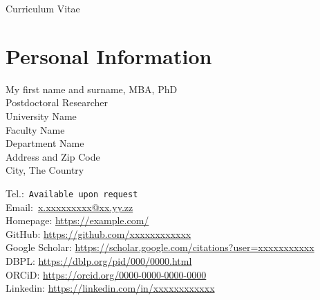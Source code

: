 \documentclass[11pt,a4paper]{article}
\newif\ifPersonalInfo %
\newcommand\phone[1]{\href{tel:#1}{{\emailfont #1}}}
\newcommand\email[1]{\href{mailto:#1}{{\emailfont #1}}}
\newcommand\emailfont{\sffamily}
\newcommand{\CVAuthor}{My first name and surname, MBA, PhD}
\newcommand{\CVWebpage}{https://example.com/}
\begin{document}
\begin{cv}{Curriculum Vitae}
\section{Personal Information}
  \begin{cvlist}{}
  \item \CVAuthor\\
    Postdoctoral Researcher\\
    University Name\\
    Faculty Name\\
    Department Name\\
    Address and Zip Code\\
    City, The Country

  \item
    \ifPersonalInfo
        Tel.:~\phone{+31 (6) xxxx-xxxx}\\
    \else
        Tel.:~\texttt{Available upon request}\\
    \fi
    Email:~\email{x.xxxxxxxxx@xx.yy.zz}\\
    \ifPersonalInfo
        GMail:~\email{xxxxxxxxxxxxx@cccc.com}\\
        Skype:~\email{xxxxxxxxxxxxx@cccc.com}\\
    \fi
    Homepage: \url{\CVWebpage}\\
    GitHub: \url{https://github.com/xxxxxxxxxxxx}\\
    Google Scholar: \url{https://scholar.google.com/citations?user=xxxxxxxxxxx}\\
    DBPL: \url{https://dblp.org/pid/000/0000.html}\\
    ORCiD: \url{https://orcid.org/0000-0000-0000-0000}\\
    Linkedin: \url{https://linkedin.com/in/xxxxxxxxxxxx}
    \ifPersonalInfo
      \item
        Birth date: 22 April 1500\\
        Place of birth: City, Country\\
        Nationality: Brazilian\\
        Marital status: xxxxxxx
    \fi
  \end{cvlist}


\end{cv}
\end{document}
